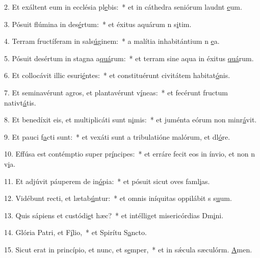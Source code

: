 2. Et exáltent eum in ecclésia pl\uline{e}bis:~* et in cáthedra seniórum laudnt \uline{e}um.\par 
3. Pósuit flúmina in des\uline{é}rtum:~* et éxitus aquárum n s\uline{i}tim.\par 
4. Terram fructíferam in sals\uline{ú}ginem:~* a malítia inhabitántium n \uline{e}a.\par 
5. Pósuit desértum in stagna a\uline{quá}rum:~* et terram sine aqua in éxitus \uline{quá}rum.\par 
6. Et collocávit illic esuri\uline{é}ntes:~* et constituérunt civitátem habitat\uline{ó}nis.\par 
7. Et seminavérunt agros, et plantavérunt v\uline{í}neas:~* et fecérunt fructum nativt\uline{á}tis.\par 
8. Et benedíxit eis, et multiplicáti sunt n\uline{i}mis:~* et juménta eórum non minr\uline{á}vit.\par 
9. Et pauci f\uline{a}cti sunt:~* et vexáti sunt a tribulatióne malórum, et dl\uline{ó}re.\par 
10. Effúsa est contémptio super pr\uline{í}ncipes:~* et erráre fecit eos in ínvio, et non n v\uline{i}a.\par 
11. Et adjúvit páuperem de in\uline{ó}pia:~* et pósuit sicut oves faml\uline{i}as.\par 
12. Vidébunt recti, et lætab\uline{ú}ntur:~* et omnis iníquitas oppilábit s s\uline{u}um.\par 
13. Quis sápiens et custódi\uline{e}t hæc?~* et intélliget misericórdias Dm\uline{i}ni.\par 
14. Glória Patri, et F\uline{í}lio,~* et Spirítu S\uline{a}ncto.\par 
15. Sicut erat in princípio, et nunc, et s\uline{e}mper,~* et in sǽcula sæculórm. \uline{A}men.\par 
